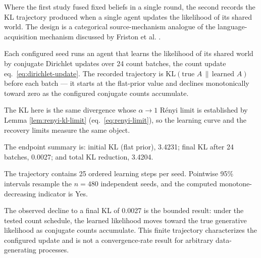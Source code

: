 \documentclass[
  english,
]{article}
\theoremstyle{plain}
\theoremstyle{definition}
\theoremstyle{remark}
\theoremstyle{definition}
\begin{document}
Where the first study fused fixed beliefs in a single round, the second
records the KL trajectory produced when a single agent updates the
likelihood of its shared world. The design is a categorical
source-mechanism analogue of the language-acquisition mechanism
discussed by Friston et al. \citep{friston2024federated}.

Each configured seed runs an agent that learns the likelihood of its
shared world by conjugate Dirichlet updates over 24 count batches, the
count update eq.~\ref{eq:dirichlet-update}. The recorded trajectory is
\(\mathrm{KL}(\text{true } A \,\|\, \text{learned } A)\) before each
batch --- it starts at the flat-prior value and declines monotonically
toward zero as the configured conjugate counts accumulate.

The KL here is the same divergence whose \(\alpha\to1\) Rényi limit is
established by Lemma \ref{lem:renyi-kl-limit}
(eq.~\ref{eq:renyi-limit}), so the learning curve and the recovery
limits measure the same object.

The endpoint summary is: initial KL (flat prior), 3.4231; final KL after
24 batches, 0.0027; and total KL reduction, 3.4204.

The trajectory contains 25 ordered learning steps per seed. Pointwise
95\% intervals resample the \(n = 480\) independent seeds, and the
computed monotone-decreasing indicator is Yes.

The observed decline to a final KL of 0.0027 is the bounded result:
under the tested count schedule, the learned likelihood moves toward the
true generative likelihood as conjugate counts accumulate. This finite
trajectory characterizes the configured update and is not a
convergence-rate result for arbitrary data-generating processes.
\end{document}
